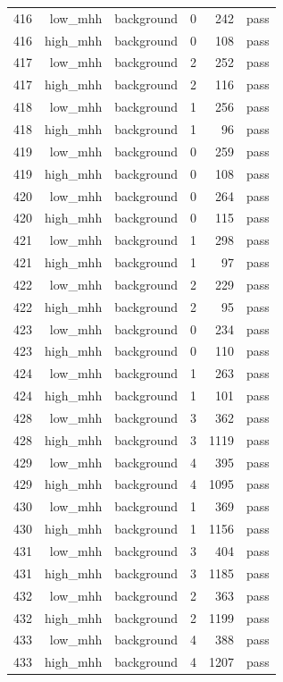 \begin{table}[htbp]
{\begin{tabular}{lrrrrr}
416 & low\_mhh & background & 0 & 242 & pass \\
416 & high\_mhh & background & 0 & 108 & pass \\
417 & low\_mhh & background & 2 & 252 & pass \\
417 & high\_mhh & background & 2 & 116 & pass \\
418 & low\_mhh & background & 1 & 256 & pass \\
418 & high\_mhh & background & 1 & 96 & pass \\
419 & low\_mhh & background & 0 & 259 & pass \\
419 & high\_mhh & background & 0 & 108 & pass \\
420 & low\_mhh & background & 0 & 264 & pass \\
420 & high\_mhh & background & 0 & 115 & pass \\
421 & low\_mhh & background & 1 & 298 & pass \\
421 & high\_mhh & background & 1 & 97 & pass \\
422 & low\_mhh & background & 2 & 229 & pass \\
422 & high\_mhh & background & 2 & 95 & pass \\
423 & low\_mhh & background & 0 & 234 & pass \\
423 & high\_mhh & background & 0 & 110 & pass \\
424 & low\_mhh & background & 1 & 263 & pass \\
424 & high\_mhh & background & 1 & 101 & pass \\
428 & low\_mhh & background & 3 & 362 & pass \\
428 & high\_mhh & background & 3 & 1119 & pass \\
429 & low\_mhh & background & 4 & 395 & pass \\
429 & high\_mhh & background & 4 & 1095 & pass \\
430 & low\_mhh & background & 1 & 369 & pass \\
430 & high\_mhh & background & 1 & 1156 & pass \\
431 & low\_mhh & background & 3 & 404 & pass \\
431 & high\_mhh & background & 3 & 1185 & pass \\
432 & low\_mhh & background & 2 & 363 & pass \\
432 & high\_mhh & background & 2 & 1199 & pass \\
433 & low\_mhh & background & 4 & 388 & pass \\
433 & high\_mhh & background & 4 & 1207 & pass \\

\end{tabular}}
\end{table}
